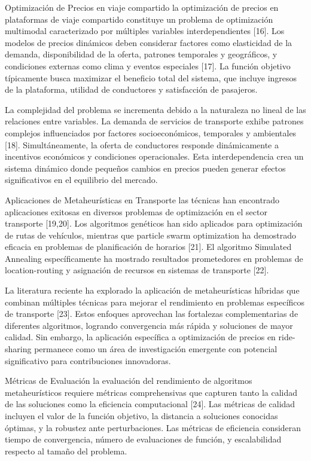\documentclass[conference]{IEEEtran}
\begin{document}
Optimización de Precios en viaje compartido la optimización de precios en plataformas de viaje compartido constituye un problema de optimización multimodal caracterizado por múltiples variables interdependientes [16]. Los modelos de precios dinámicos deben considerar factores como elasticidad de la demanda, disponibilidad de la oferta, patrones temporales y geográficos, y condiciones externas como clima y eventos especiales [17]. La función objetivo típicamente busca maximizar el beneficio total del sistema, que incluye ingresos de la plataforma, utilidad de conductores y satisfacción de pasajeros.

La complejidad del problema se incrementa debido a la naturaleza no lineal de las relaciones entre variables. La demanda de servicios de transporte exhibe patrones complejos influenciados por factores socioeconómicos, temporales y ambientales [18]. Simultáneamente, la oferta de conductores responde dinámicamente a incentivos económicos y condiciones operacionales. Esta interdependencia crea un sistema dinámico donde pequeños cambios en precios pueden generar efectos significativos en el equilibrio del mercado.

Aplicaciones de Metaheurísticas en Transporte las técnicas han encontrado aplicaciones exitosas en diversos problemas de optimización en el sector transporte [19,20]. Los algoritmos genéticos han sido aplicados para optimización de rutas de vehículos, mientras que particle swarm optimization ha demostrado eficacia en problemas de planificación de horarios [21]. El algoritmo Simulated Annealing específicamente ha mostrado resultados prometedores en problemas de location-routing y asignación de recursos en sistemas de transporte [22].

La literatura reciente ha explorado la aplicación de metaheurísticas híbridas que combinan múltiples técnicas para mejorar el rendimiento en problemas específicos de transporte [23]. Estos enfoques aprovechan las fortalezas complementarias de diferentes algoritmos, logrando convergencia más rápida y soluciones de mayor calidad. Sin embargo, la aplicación específica a optimización de precios en ride-sharing permanece como un área de investigación emergente con potencial significativo para contribuciones innovadoras.

Métricas de Evaluación la evaluación del rendimiento de algoritmos metaheurísticos requiere métricas comprehensivas que capturen tanto la calidad de las soluciones como la eficiencia computacional [24]. Las métricas de calidad incluyen el valor de la función objetivo, la distancia a soluciones conocidas óptimas, y la robustez ante perturbaciones. Las métricas de eficiencia consideran tiempo de convergencia, número de evaluaciones de función, y escalabilidad respecto al tamaño del problema.
\end{document}
